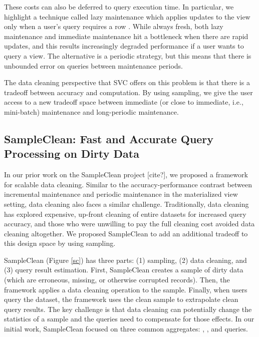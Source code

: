These costs can also be deferred to query execution time.
In particular, we highlight a technique called lazy maintenance which applies updates to the view only when a user's query requires a row \cite{zhou2007lazy}.
While always fresh, both lazy maintenance and immediate maintenance hit a bottleneck when there are rapid updates, and this results increasingly degraded performance if a user wants to query a view.
The alternative is a periodic strategy, but this means that there is unbounded error on queries between maintenance periods.

The data cleaning perspective that SVC offers on this problem is that there is a tradeoff between accuracy and computation.
By using sampling, we give the user access to a new tradeoff space between immediate (or close to immediate, i.e., mini-batch) maintenance and long-periodic maintenance.

\subsection{SampleClean: Fast and Accurate Query Processing on Dirty Data}
In our prior work on the SampleClean project [cite?], we proposed a framework for scalable data cleaning.
Similar to the accuracy-performance contrast between incremental maintenance and periodic maintenance in the materialized view setting, data cleaning also faces a similar challenge.
Traditionally, data cleaning has explored expensive, up-front cleaning of entire datasets for increased query accuracy, and those who were unwilling to pay the full cleaning cost avoided data cleaning altogether.
We proposed SampleClean to add an additional tradeoff to this design space by using sampling.

SampleClean (Figure \ref{sc}) has three parts: (1) sampling, (2) data cleaning, and (3) query result estimation.
First, SampleClean creates a sample of dirty data (which are erroneous, missing, or otherwise corrupted records).
Then, the framework applies a data cleaning operation to the sample.
Finally, when users query the dataset, the framework uses the clean sample to extrapolate clean query results.
The key challenge is that data cleaning can potentially change the statistics of a sample and the queries need to compensate for those effects.
In our initial work, SampleClean focused on three common aggregates: \sumfunc, \avgfunc, and \countfunc queries.

